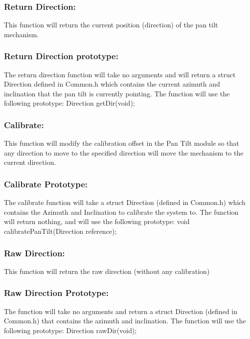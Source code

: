 \documentclass[]{article}
\begin{document}
\subsubsection{Return Direction:}
This function will return the current position (direction) of the pan tilt mechanism.

\subsubsection{Return Direction prototype:}
The return direction function will take no arguments and will return a struct Direction defined in Common.h which contains the current azimuth and inclination that the pan tilt is currently pointing. The function will use the following prototype: \newline \newline
Direction getDir(void);

\subsubsection{Calibrate:}
This function will modify the calibration offset in the Pan Tilt module so that any direction to move to the specified direction will move the mechanism to the current direction.

\subsubsection{Calibrate Prototype:}
The calibrate function will take a struct Direction (defined in Common.h) which contains the Azimuth and Inclination to calibrate the system to. The function will return nothing, and will use the following prototype: \newline \newline
void calibratePanTilt(Direction reference);

\subsubsection{Raw Direction:}
This function will return the raw direction (without any calibration)

\subsubsection{Raw Direction Prototype:}
The function will take no arguments and return a struct Direction (defined in Common.h) that contains the azimuth and inclination. The function will use the following prototype: \newline \newline
Direction rawDir(void);
\end{document}
